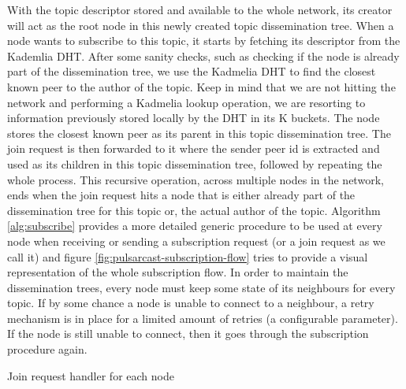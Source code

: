 With the topic descriptor stored and available to the whole network, its
creator will act as the root node in this newly created topic dissemination
tree. When a node wants to subscribe to this topic, it starts by fetching its
descriptor from the Kademlia DHT. After some sanity checks, such as checking if
the node is already part of the dissemination tree, we use the Kadmelia DHT to
find the closest known peer to the author of the topic. Keep in mind that we
are not hitting the network and performing a Kadmelia lookup operation, we are
resorting to information previously stored locally by the DHT in its K buckets.
The node stores the closest known peer as its parent in this topic
dissemination tree. The join request is then forwarded to it where the sender
peer id is extracted and used as its children in this topic dissemination tree,
followed by repeating the whole process. This recursive operation, across
multiple nodes in the network, ends when the join request hits a node that is
either already part of the dissemination tree for this topic or, the actual
author of the topic. Algorithm \ref{alg:subscribe} provides a more detailed
generic procedure to be used at every node when receiving or sending a
subscription request (or a join request as we call it) and figure
\ref{fig:pulsarcast-subscription-flow} tries to provide a visual representation
of the whole subscription flow. In order to maintain the dissemination trees,
every node must keep some state of its neighbours for every topic. If by some
chance a node is unable to connect to a neighbour, a retry mechanism is in
place for a limited amount of retries (a configurable parameter). If the node
is still unable to connect, then it goes through the subscription procedure
again.

\vspace{8pt}
\begin{algorithm}[H]
  \SetAlgoLined
  \caption{Join request handler for each node}
    \label{alg:subscribe}
\end{algorithm}
\vspace{8pt}

